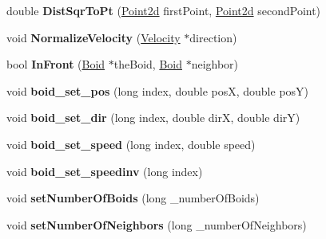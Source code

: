 \begin{DoxyCompactItemize}
\item 
\hypertarget{class_boids_manager_af66fa1589341596a77dbd6f7e13023a7}{double {\bfseries Dist\-Sqr\-To\-Pt} (\hyperlink{struct_point2d}{Point2d} first\-Point, \hyperlink{struct_point2d}{Point2d} second\-Point)}\label{class_boids_manager_af66fa1589341596a77dbd6f7e13023a7}

\item 
\hypertarget{class_boids_manager_a188dcc3a8e53700815838d0ff5a2cff4}{void {\bfseries Normalize\-Velocity} (\hyperlink{struct_velocity}{Velocity} $\ast$direction)}\label{class_boids_manager_a188dcc3a8e53700815838d0ff5a2cff4}

\item 
\hypertarget{class_boids_manager_a2b41e006b4edf55b10bc5854a7364b58}{bool {\bfseries In\-Front} (\hyperlink{class_boid}{Boid} $\ast$the\-Boid, \hyperlink{class_boid}{Boid} $\ast$neighbor)}\label{class_boids_manager_a2b41e006b4edf55b10bc5854a7364b58}

\item 
\hypertarget{class_boids_manager_a08722665999e7476f58ed5e300f4af32}{void {\bfseries boid\-\_\-set\-\_\-pos} (long index, double pos\-X, double pos\-Y)}\label{class_boids_manager_a08722665999e7476f58ed5e300f4af32}

\item 
\hypertarget{class_boids_manager_a5f3baec1959a0e0de26bddab21710312}{void {\bfseries boid\-\_\-set\-\_\-dir} (long index, double dir\-X, double dir\-Y)}\label{class_boids_manager_a5f3baec1959a0e0de26bddab21710312}

\item 
\hypertarget{class_boids_manager_a60b68a6d745989e2eedaf567c0605d0a}{void {\bfseries boid\-\_\-set\-\_\-speed} (long index, double speed)}\label{class_boids_manager_a60b68a6d745989e2eedaf567c0605d0a}

\item 
\hypertarget{class_boids_manager_ad30fc5fde2c8cc54e20396b7fe1458ce}{void {\bfseries boid\-\_\-set\-\_\-speedinv} (long index)}\label{class_boids_manager_ad30fc5fde2c8cc54e20396b7fe1458ce}

\item 
\hypertarget{class_boids_manager_a6850560000b33739e9861ed881c10886}{void {\bfseries set\-Number\-Of\-Boids} (long \-\_\-number\-Of\-Boids)}\label{class_boids_manager_a6850560000b33739e9861ed881c10886}

\item 
\hypertarget{class_boids_manager_a77d11b4a7a9fe6d3115861c4719a0a91}{void {\bfseries set\-Number\-Of\-Neighbors} (long \-\_\-number\-Of\-Neighbors)}\label{class_boids_manager_a77d11b4a7a9fe6d3115861c4719a0a91}


\end{DoxyCompactItemize}
